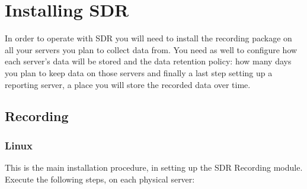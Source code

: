 \pagebreak
\section{Installing SDR}
\noindent
In order to operate with SDR you will need to install 
the recording package on all your servers you plan to 
collect data from. You need as well to configure how 
each server's data will be stored and the data 
retention policy: how many days you plan to keep 
data on those servers and finally a last step setting up
a reporting server, a place you will store the recorded 
data over time.

\subsection*{Recording}


\subsubsection*{Linux}
This is the main installation procedure, in setting up
the SDR Recording module. Execute the following steps,
on each physical server:

